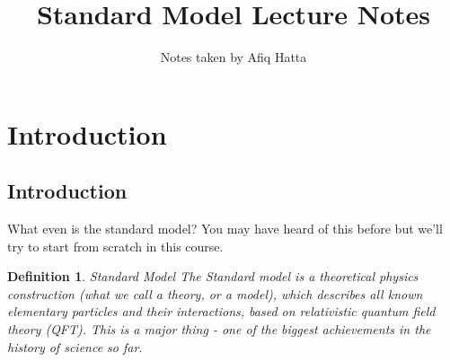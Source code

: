 \documentclass[11pt, oneside]{article}   	%
\title{Standard Model Lecture Notes}
\author{Notes taken by Afiq Hatta}
\theoremstyle{slanted}
\newtheorem*{defn}{Definition}
\begin{document}
 
\maketitle
\tableofcontents

\pagebreak 

\section{Introduction}%
\label{sec:introduction}

\subsection{Introduction} 
What even is the standard model? You may have 
heard of this before but we'll try to start from scratch 
in this course. 

\begin{defn}{Standard Model}
The Standard model is a theoretical physics construction 
(what we call a theory, or a model), which describes all 
known elementary particles and their interactions, based on 
relativistic quantum field theory (QFT). 
This is a major thing - one of the biggest achievements 
in the history of science so far. 
\end{defn}
\end{document}
